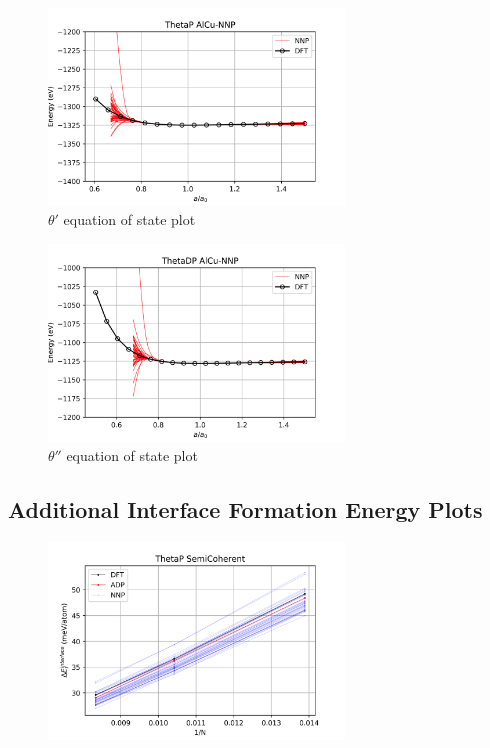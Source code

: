 \documentclass{article}
\begin{document}
\begin{figure}[H]%
\centering%
\includegraphics[width=0.7\textwidth,center]{figures/EOS_AlCu-NNP_ThetaP.png}%
\caption{$\theta'$ equation of state plot}%
\end{figure}

\begin{figure}[H]%
\centering%
\includegraphics[width=0.7\textwidth,center]{figures/EOS_AlCu-NNP_ThetaDP.png}%
\caption{$\theta''$ equation of state plot}%
\end{figure}

\subsection{Additional Interface Formation Energy Plots} \label{sct:add_interface}

\begin{figure}[H]%
\centering%
\includegraphics[width=0.7\textwidth,center]{figures/InterfaceSlope_ThetaP_SemiCoherent.png}%
\end{figure}
\end{document}
